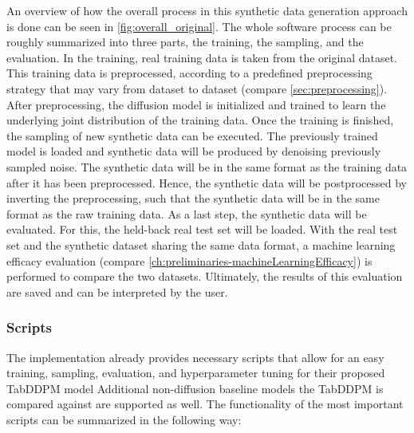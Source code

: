 An overview of how the overall process in this synthetic data generation approach is done can be seen in \autoref{fig:overall_original}.
The whole software process can be roughly summarized into three parts, the training, the sampling, and the evaluation.
In the training, real training data is taken from the original dataset.
This training data is preprocessed, according to a predefined preprocessing strategy that may vary from dataset to dataset (compare \autoref{sec:preprocessing}).
After preprocessing, the diffusion model is initialized and trained to learn the underlying joint distribution of the training data.
Once the training is finished, the sampling of new synthetic data can be executed.
The previously trained model is loaded and synthetic data will be produced by denoising previously sampled noise.
The synthetic data will be in the same format as the training data after it has been preprocessed.
Hence, the synthetic data will be postprocessed by inverting the preprocessing, such that the synthetic data will be in the same format as the raw training data.
As a last step, the synthetic data will be evaluated. 
For this, the held-back real test set will be loaded.
With the real test set and the synthetic dataset sharing the same data format, a machine learning efficacy evaluation (compare \autoref{ch:preliminaries-machineLearningEfficacy}) is performed to compare the two datasets.
Ultimately, the results of this evaluation are saved and can be interpreted by the user.

\subsubsection[]{Scripts}
\label{ch:scripts}

The implementation \cite{kotelnikov2022TabDDPMModellingTabular} already provides necessary scripts that allow for an
easy training, sampling, evaluation, and hyperparameter tuning for their proposed TabDDPM model
Additional non-diffusion baseline models the TabDDPM is compared against are supported as well.
The functionality of the most important scripts can be summarized in the following way:

